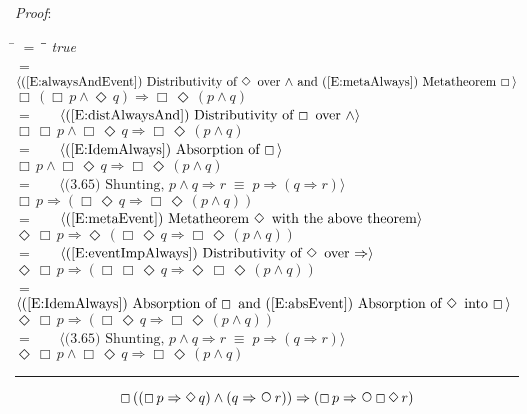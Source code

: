 \documentclass[12pt, fleqn, leqno]{article}
\newcommand{\lgap}{2pt}                             %
\newcommand{\mymathindent}{24pt}                    %
\newcommand{\equivs}{\ensuremath{\;\equiv\;}}       %
\newcommand{\impl}{\ensuremath{\Rightarrow}}        %
\newcommand{\Next}{\;\,\text{\raisebox{3.5pt}{\circle{6}}}}
\newcommand{\Event}{\Diamond\,}
\newcommand{\Always}{\Box\,}
\newcommand{\myqed}{\rule[-.23ex]{1.2ex}{2.0ex}}
\newcommand{\myqedtab}{\hspace{384pt}}              %
\newcommand{\Gll} {\langle}                         %
\newcommand{\Ggg} {\rangle}                         %
\newcommand{\Hint}[1]     {\ \ \ $\Gll              \mbox{#1} \Ggg$ }   %
\begin{document}
\emph{Proof}:
\begin{tabbing}
\hspace{\mymathindent} \= $= \;$ \= \myqedtab \= \kill
\> \>   \textit{true}\\[\lgap]
\> $=$  \>  \Hint{(\ref{E:alwaysAndEvent}) Distributivity of $\Event$ over $\land$ and (\ref{E:metaAlways}) Metatheorem $\Always$}\\[\lgap]
\> \>   $\Always (\Always p \land \Event q) \impl \Always\Event (p \land q)$\\[\lgap]
\> $=$  \>  \Hint{(\ref{E:distAlwaysAnd}) Distributivity of $\Always$ over $\land$}\\[\lgap]
\> \>   $\Always \Always p \land \Always\Event q \impl \Always\Event (p \land q)$\\[\lgap]
\> $=$  \>  \Hint{(\ref{E:IdemAlways}) Absorption of $\Always$}\\[\lgap]
\> \>   $\Always p \land \Always\Event q \impl \Always\Event (p \land q)$\\[\lgap]
\> $=$  \>  \Hint{(3.65) Shunting, $p\land q\impl r\equivs p\impl (q\impl r)$}\\[\lgap]
\> \>   $\Always p \impl (\Always\Event q \impl \Always\Event (p \land q))$\\[\lgap]
\> $=$  \>  \Hint{(\ref{E:metaEvent}) Metatheorem $\Event$ with the above theorem}\\[\lgap]
\> \>   $\Event\Always p \impl \Event(\Always\Event q \impl \Always\Event (p \land q))$\\[\lgap]
\> $=$  \>  \Hint{(\ref{E:eventImpAlways}) Distributivity of $\Event$ over $\impl$}\\[\lgap]
\> \>   $\Event\Always p \impl (\Always\Always\Event q \impl \Event\Always\Event (p \land q))$\\[\lgap]
\> $=$  \>  \Hint{(\ref{E:IdemAlways}) Absorption of $\Always$ and (\ref{E:absEvent}) Absorption of $\Event$ into $\Always$}\\[\lgap]
\> \>   $\Event\Always p \impl (\Always\Event q \impl \Always\Event (p \land q))$\\[\lgap]
\> $=$  \>  \Hint{(3.65) Shunting, $p\land q\impl r\equivs p\impl (q\impl r)$}\\[\lgap]
\> \>   $\Event\Always p\land \Always\Event q \impl \Always\Event (p\land q)$ \quad \myqed
\end{tabbing}
\begin{equation}\label{E:kroger49}
 \Always ((\Always p \impl \Event q) \land (q \impl \Next r)) \impl (\Always p \impl \Next \Always \Event r)
\end{equation}
\end{document}
